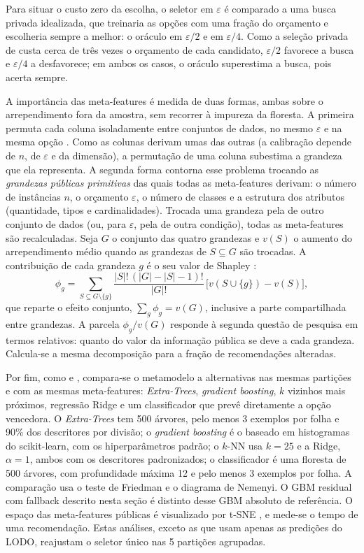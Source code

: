 Para situar o custo zero da escolha, o seletor em $\varepsilon$ é comparado a uma busca privada idealizada, que treinaria as opções com uma fração do orçamento e escolheria sempre a melhor: o oráculo em $\varepsilon/2$ e em $\varepsilon/4$. Como a seleção privada de  custa cerca de três vezes o orçamento de cada candidato, $\varepsilon/2$ favorece a busca e $\varepsilon/4$ a desfavorece; em ambos os casos, o oráculo superestima a busca, pois acerta sempre.

A importância das meta-features é medida de duas formas, ambas sobre o arrependimento fora da amostra, sem recorrer à impureza da floresta. A primeira permuta cada coluna isoladamente entre conjuntos de dados, no mesmo $\varepsilon$ e na mesma opção \cite{ref77}. Como as colunas derivam umas das outras (a calibração depende de $n$, de $\varepsilon$ e da dimensão), a permutação de uma coluna subestima a grandeza que ela representa. A segunda forma contorna esse problema trocando as \emph{grandezas públicas primitivas} das quais todas as meta-features derivam: o número de instâncias $n$, o orçamento $\varepsilon$, o número de classes e a estrutura dos atributos (quantidade, tipos e cardinalidades). Trocada uma grandeza pela de outro conjunto de dados (ou, para $\varepsilon$, pela de outra condição), todas as meta-features são recalculadas. Seja $G$ o conjunto das quatro grandezas e $v(S)$ o aumento do arrependimento médio quando as grandezas de $S \subseteq G$ são trocadas. A contribuição de cada grandeza $g$ é o seu valor de Shapley \cite{ref75,ref76}:
\begin{equation}
    \phi_g = \sum_{S \subseteq G \setminus \{g\}} \frac{|S|!\,(|G| - |S| - 1)!}{|G|!}\,\big[v(S \cup \{g\}) - v(S)\big],
    \label{eq:shapley}
\end{equation}
que reparte o efeito conjunto, $\sum_g \phi_g = v(G)$, inclusive a parte compartilhada entre grandezas. A parcela $\phi_g / v(G)$ responde à segunda questão de pesquisa em termos relativos: quanto do valor da informação pública se deve a cada grandeza. Calcula-se a mesma decomposição para a fração de recomendações alteradas.

Por fim, como  e , compara-se o metamodelo a alternativas nas mesmas partições e com as mesmas meta-features: \textit{Extra-Trees}, \textit{gradient boosting}, $k$ vizinhos mais próximos, regressão Ridge e um classificador que prevê diretamente a opção vencedora. O \textit{Extra-Trees} tem 500 árvores, pelo menos 3 exemplos por folha e 90\% dos descritores por divisão; o \textit{gradient boosting} é o baseado em histogramas do scikit-learn, com os hiperparâmetros padrão; o $k$-NN usa $k=25$ e a Ridge, $\alpha=1$, ambos com os descritores padronizados; o classificador é uma floresta de 500 árvores, com profundidade máxima 12 e pelo menos 3 exemplos por folha. A comparação usa o teste de Friedman e o diagrama de Nemenyi. O GBM residual com fallback descrito nesta seção é distinto desse GBM absoluto de referência. O espaço das meta-features públicas é visualizado por t-SNE \cite{ref79}, e mede-se o tempo de uma recomendação. Estas análises, exceto as que usam apenas as predições do LODO, reajustam o seletor único nas 5 partições agrupadas.


